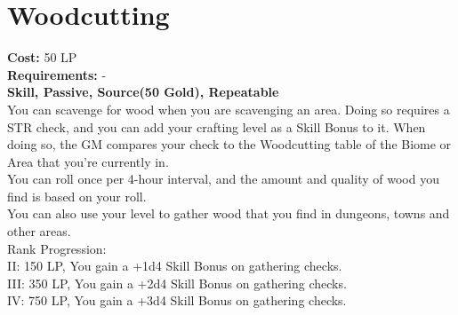 \section{Woodcutting}\label{perk:woodcutting}
\textbf{Cost:} 50 LP\\
\textbf{Requirements:} -\\
\textbf{Skill, Passive, Source(50 Gold), Repeatable}\\
You can scavenge for wood when you are scavenging an area.
Doing so requires a STR check, and you can add your crafting level as a Skill Bonus to it.
When doing so, the GM compares your check to the Woodcutting table of the Biome or Area that you're currently in.\\
You can roll once per 4-hour interval, and the amount and quality of wood you find is based on your roll.\\
You can also use your level to gather wood that you find in dungeons, towns and other areas.
\\
Rank Progression:\\
II: 150 LP, You gain a +1d4 Skill Bonus on gathering checks.\\
III: 350 LP, You gain a +2d4 Skill Bonus on gathering checks.\\
IV: 750 LP, You gain a +3d4 Skill Bonus on gathering checks.\\